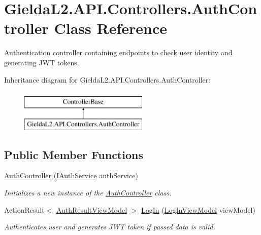 \hypertarget{class_gielda_l2_1_1_a_p_i_1_1_controllers_1_1_auth_controller}{}\section{Gielda\+L2.\+A\+P\+I.\+Controllers.\+Auth\+Controller Class Reference}
\label{class_gielda_l2_1_1_a_p_i_1_1_controllers_1_1_auth_controller}


Authentication controller containing endpoints to check user identity and generating J\+WT tokens.  


Inheritance diagram for Gielda\+L2.\+A\+P\+I.\+Controllers.\+Auth\+Controller\+:\begin{figure}[H]
\begin{center}
\leavevmode
\includegraphics[height=2.000000cm]{class_gielda_l2_1_1_a_p_i_1_1_controllers_1_1_auth_controller}
\end{center}
\end{figure}
\subsection*{Public Member Functions}
\begin{DoxyCompactItemize}
\item 
\mbox{\hyperlink{class_gielda_l2_1_1_a_p_i_1_1_controllers_1_1_auth_controller_a712994fbcc88bd7badac6459a856e0cc}{Auth\+Controller}} (\mbox{\hyperlink{interface_gielda_l2_1_1_i_n_f_r_a_s_t_r_u_c_t_u_r_e_1_1_interfaces_1_1_i_auth_service}{I\+Auth\+Service}} auth\+Service)
\begin{DoxyCompactList}\small\item\em Initializes a new instance of the \mbox{\hyperlink{class_gielda_l2_1_1_a_p_i_1_1_controllers_1_1_auth_controller}{Auth\+Controller}} class. \end{DoxyCompactList}\item 
Action\+Result$<$ \mbox{\hyperlink{class_gielda_l2_1_1_a_p_i_1_1_view_models_1_1_view_1_1_auth_result_view_model}{Auth\+Result\+View\+Model}} $>$ \mbox{\hyperlink{class_gielda_l2_1_1_a_p_i_1_1_controllers_1_1_auth_controller_a59d18da2df4b70759ed8d3803c2b4605}{Log\+In}} (\mbox{\hyperlink{class_gielda_l2_1_1_a_p_i_1_1_view_models_1_1_view_1_1_log_in_view_model}{Log\+In\+View\+Model}} view\+Model)
\begin{DoxyCompactList}\small\item\em Authenticates user and generates J\+WT token if passed data is valid. \end{DoxyCompactList}\end{DoxyCompactItemize}


